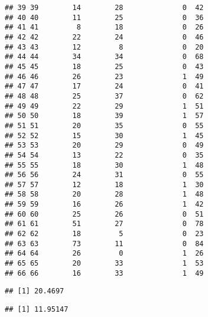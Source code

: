 \documentclass[
]{article}
\newenvironment{Shaded}{\begin{snugshade}}{\end{snugshade}}
\newcommand{\CommentTok}[1]{\textcolor[rgb]{0.56,0.35,0.01}{\textit{#1}}}
\newcommand{\FunctionTok}[1]{\textcolor[rgb]{0.00,0.00,0.00}{#1}}
\newcommand{\NormalTok}[1]{#1}
\newcommand{\OtherTok}[1]{\textcolor[rgb]{0.56,0.35,0.01}{#1}}
\newcommand{\SpecialCharTok}[1]{\textcolor[rgb]{0.00,0.00,0.00}{#1}}
\begin{document}
\begin{verbatim}
## 39 39        14        28              0  42
## 40 40        11        25              0  36
## 41 41         8        18              0  26
## 42 42        22        24              0  46
## 43 43        12         8              0  20
## 44 44        34        34              0  68
## 45 45        18        25              0  43
## 46 46        26        23              1  49
## 47 47        17        24              0  41
## 48 48        25        37              0  62
## 49 49        22        29              1  51
## 50 50        18        39              1  57
## 51 51        20        35              0  55
## 52 52        15        30              1  45
## 53 53        20        29              0  49
## 54 54        13        22              0  35
## 55 55        18        30              1  48
## 56 56        24        31              0  55
## 57 57        12        18              1  30
## 58 58        20        28              1  48
## 59 59        16        26              1  42
## 60 60        25        26              0  51
## 61 61        51        27              0  78
## 62 62        18         5              0  23
## 63 63        73        11              0  84
## 64 64        26         0              1  26
## 65 65        20        33              1  53
## 66 66        16        33              1  49
\end{verbatim}

\begin{Shaded}
\end{Shaded}

\begin{verbatim}
## [1] 20.4697
\end{verbatim}

\begin{Shaded}
\end{Shaded}

\begin{verbatim}
## [1] 11.95147
\end{verbatim}
\end{document}
